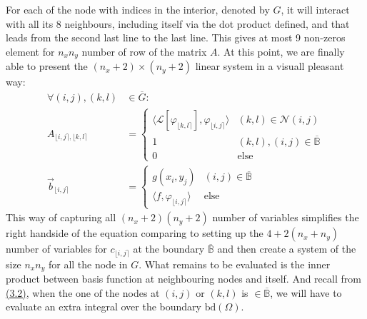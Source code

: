 \documentclass[]{article}
\begin{document}
    For each of the node with indices in the interior, denoted by $G$, it will interact with all its 8 neighbours, including itself via the dot product defined, and that leads from the second last line to the last line. This gives at most 9 non-zeros element for $n_xn_y$ number of row of the matrix $A$. At this point, we are finally able to present the $(n_x + 2)\times(n_y + 2)$ linear system in a visuall pleasant way: 
    \begin{align*}\tag{3.8}\label{eqn:3.8}
        \forall  (i,j), (k, l) &\in \overline{G}: 
        \\
        A_{\lfloor i,j \rceil, \lfloor k, l \rceil}
        &= 
        \begin{cases}
            \langle \mathcal{L}[\varphi_{\lfloor k, l \rceil}], \varphi_{\lfloor i,j \rceil}\rangle & (k, l) \in \mathcal{N}(i, j)
            \\
            1 & (k, l), (i, j) \in \overline{\mathbb{B}}
            \\
            0 & \text{else}
        \end{cases}
        \\
        \vec{b}_{\lfloor i,j \rceil} &= 
        \begin{cases}
            g(x_i, y_j) & (i, j)\in \overline{\mathbb{B}}
            \\
            \langle f,\varphi_{\lfloor i,j \rceil} \rangle & \text{else}
        \end{cases}
    \end{align*}
    This way of capturing all $(n_x + 2)(n_y + 2)$ number of variables simplifies the right handside of the equation comparing to setting up the $4 + 2(n_x + n_y)$ number of variables for $c_{\lfloor i, j\rceil}$ at the boundary $\overline{\mathbb{B}}$ and then create a system of the size $n_xn_y$ for all the node in $G$. What remains to be evaluated is the inner product between basis function at neighbouring nodes and itself. And recall from \hyperref[eqn:3.2]{(3.2)}, when the one of the nodes at $(i,j)$ or $(k, l)$ is $\in \overline{\mathbb{B}}$, we will have to evaluate an extra integral over the boundary $\text{bd}(\Omega)$. 

        
\end{document}

